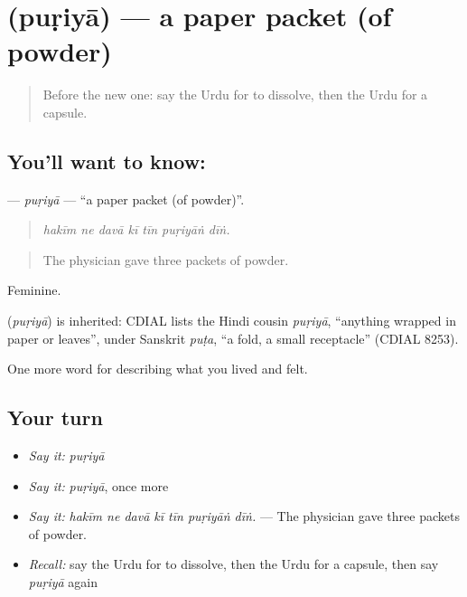 \section[\texorpdfstring{\ur{پڑیا} (puṛiyā)}{پڑیا (puṛiyā)}]{ (puṛiyā) — a paper packet (of powder)}

\label{lesson:UR-C477-puriya}



\begin{quote}
Before the new one: say the Urdu for to dissolve, then the Urdu for a capsule.
\end{quote}

\subsection*{You'll want to know: }
\textbf{} — \emph{puṛiyā} — \textquotedblleft{}a paper packet (of powder)\textquotedblright{}.

\begin{quote}
      
\end{quote}

\begin{quote}
\emph{hakīm ne davā kī tīn puṛiyāṅ dīṅ.}
\end{quote}

\begin{quote}
The physician gave three packets of powder.
\end{quote}

Feminine.

\begin{cousinweb}
\textbf{} (\emph{puṛiyā}) is inherited: CDIAL lists the Hindi cousin \emph{puṛiyā}, \textquotedblleft{}anything wrapped in paper or leaves\textquotedblright{}, under Sanskrit \emph{puṭa}, \textquotedblleft{}a fold, a small receptacle\textquotedblright{} (CDIAL 8253).
\end{cousinweb}

\begin{grammarlens}[title={What you've built}]
One more word for describing what you lived and felt.
\end{grammarlens}

\subsection*{Your turn}
\begin{itemize}
\raggedright
  \item \emph{Say it:} \emph{puṛiyā}
  \item \emph{Say it:} \emph{puṛiyā}, once more
  \item \emph{Say it:} \emph{hakīm ne davā kī tīn puṛiyāṅ dīṅ.} — The physician gave three packets of powder.
  \item \emph{Recall:} say the Urdu for to dissolve, then the Urdu for a capsule, then say \emph{puṛiyā} again
\end{itemize}


